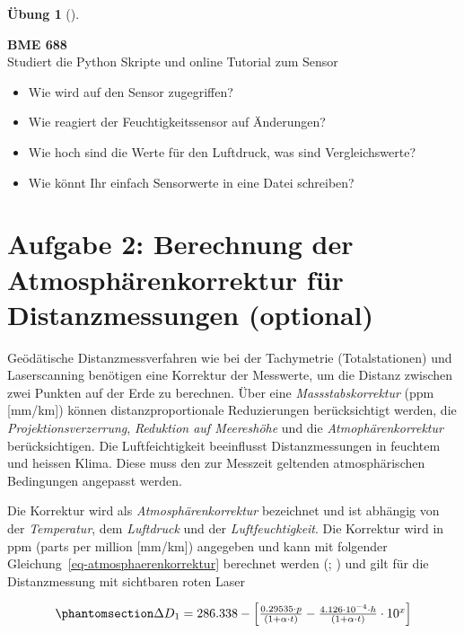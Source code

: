 \documentclass[
  11pt,
  a4paperpaper,
  oneside, openany  ,captions=tableheading
]{scrbook}
\providecommand{\tightlist}{%
  \setlength{\itemsep}{0pt}\setlength{\parskip}{0pt}}
\theoremstyle{definition}
\newtheorem{exercise}{Übung}[chapter]
\theoremstyle{remark}
\begin{document}
\begin{exercise}[]\protect\hypertarget{exr-luftqualitaet}{}\label{exr-luftqualitaet}

\textbf{BME 688}\\
Studiert die Python Skripte und online Tutorial zum Sensor

\begin{itemize}
\tightlist
\item
  Wie wird auf den Sensor zugegriffen?
\item
  Wie reagiert der Feuchtigkeitssensor auf Änderungen?
\item
  Wie hoch sind die Werte für den Luftdruck, was sind Vergleichswerte?
\item
  Wie könnt Ihr einfach Sensorwerte in eine Datei schreiben?
\end{itemize}

\end{exercise}

\section{Aufgabe 2: Berechnung der Atmosphärenkorrektur für
Distanzmessungen
(optional)}\label{aufgabe-2-berechnung-der-atmosphuxe4renkorrektur-fuxfcr-distanzmessungen-optional}

Geödätische Distanzmessverfahren wie bei der Tachymetrie
(Totalstationen) und Laserscanning benötigen eine Korrektur der
Messwerte, um die Distanz zwischen zwei Punkten auf der Erde zu
berechnen. Über eine \emph{Massstabskorrektur} (ppm {[}mm/km{]}) können
distanzproportionale Reduzierungen berücksichtigt werden, die
\emph{Projektionsverzerrung}, \emph{Reduktion auf Meereshöhe} und die
\emph{Atmophärenkorrektur} berücksichtigen. Die Luftfeichtigkeit
beeinflusst Distanzmessungen in feuchtem und heissen Klima. Diese muss
den zur Messzeit geltenden atmosphärischen Bedingungen angepasst werden.

Die Korrektur wird als \emph{Atmosphärenkorrektur} bezeichnet und ist
abhängig von der \emph{Temperatur}, dem \emph{Luftdruck} und der
\emph{Luftfeuchtigkeit}. Die Korrektur wird in ppm (parts per million
{[}mm/km{]}) angegeben und kann mit folgender
Gleichung~\ref{eq-atmosphaerenkorrektur} berechnet werden
(;
) und
gilt für die Distanzmessung mit sichtbaren roten Laser

\begin{equation}\phantomsection\label{eq-atmosphaerenkorrektur}{
\Delta D_1 = 286.338 - \begin{bmatrix}\frac{0.29535 \cdot p}{(1+\alpha \cdot t)}-\frac{4.126 \cdot 10^{-4} \cdot h}{(1+\alpha \cdot t)} \cdot 10^x\end{bmatrix}
}\end{equation}
\end{document}
